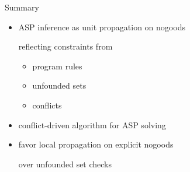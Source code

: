 \begin{frame}{Summary}
  \begin{itemize}
  \item ASP inference as unit propagation on nogoods

    reflecting constraints from
    \begin{itemize}
    \item program rules
    \item unfounded sets
    \item conflicts
    \end{itemize}
  \item conflict-driven algorithm for ASP solving
  \item favor local propagation on explicit nogoods

    over unfounded set checks
  \end{itemize}
\end{frame}
%
